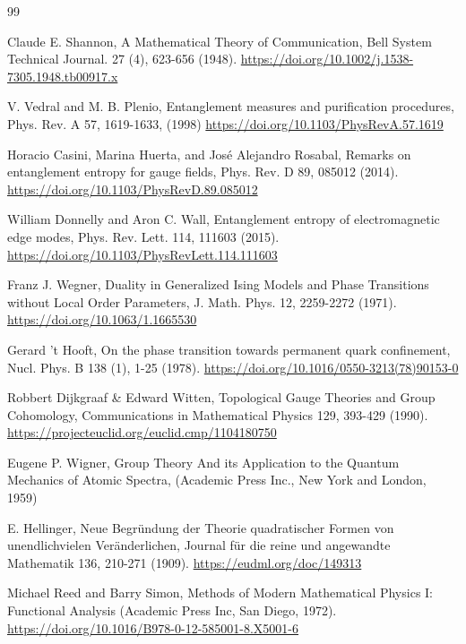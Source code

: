 \documentclass[12pt,a4paper]{article}
\begin{document}
\begin{thebibliography}{99}
	
	Claude E. Shannon, 
	A Mathematical Theory of Communication,
	Bell System Technical Journal. 27 (4), 623-656 (1948).
	\url{https://doi.org/10.1002/j.1538-7305.1948.tb00917.x}
	
	
	V. Vedral and M. B. Plenio,
	Entanglement measures and purification procedures,
	Phys. Rev. A 57, 1619-1633, (1998)
	\url{https://doi.org/10.1103/PhysRevA.57.1619}
	
	
	Horacio Casini, Marina Huerta, and José Alejandro Rosabal,
	Remarks on entanglement entropy for gauge fields,
	Phys. Rev. D 89, 085012 (2014).
	\url{https://doi.org/10.1103/PhysRevD.89.085012}
	
	
	William Donnelly and Aron C. Wall,
	Entanglement entropy of electromagnetic edge modes,
	Phys. Rev. Lett. 114, 111603 (2015).
	\url{https://doi.org/10.1103/PhysRevLett.114.111603}
	
		
	
	Franz J. Wegner,
	Duality in Generalized Ising Models and Phase Transitions without Local Order Parameters,
	J. Math. Phys. 12, 2259-2272 (1971).
	\url{https://doi.org/10.1063/1.1665530} 
	
	
	Gerard ’t Hooft,
	On the phase transition towards permanent quark confinement,
	Nucl. Phys. B 138 (1), 1-25 (1978).  
	\url{https://doi.org/10.1016/0550-3213(78)90153-0}
	
	
	Robbert Dijkgraaf \& Edward Witten,
	Topological Gauge Theories and Group Cohomology,
	Communications in Mathematical Physics 129, 393-429 (1990).  
	\url{https://projecteuclid.org/euclid.cmp/1104180750}
	
		
	Eugene P. Wigner,
	Group Theory And its Application to the Quantum Mechanics of Atomic Spectra,
	(Academic Press Inc., New York and London, 1959)
	
	
	E. Hellinger,
	Neue Begründung der Theorie quadratischer Formen von unendlichvielen Veränderlichen,
	Journal für die reine und angewandte Mathematik 136, 210-271 (1909).
	\url{https://eudml.org/doc/149313}
	
	
	Michael Reed and Barry Simon,
	Methods of Modern Mathematical Physics I: Functional Analysis
	(Academic Press Inc, San Diego, 1972).
	\url{https://doi.org/10.1016/B978-0-12-585001-8.X5001-6}
	

\end{thebibliography}
\end{document}
